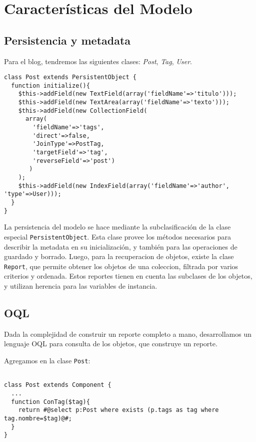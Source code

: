 \section{Características del Modelo}

\subsection{Persistencia y metadata}
\label{sub-pers}

Para el blog, tendremos las siguientes clases: \emph{Post}, \emph{Tag}, \emph{User}.

\begin{verbatim}
class Post extends PersistentObject {
  function initialize(){
    $this->addField(new TextField(array('fieldName'=>'titulo')));
    $this->addField(new TextArea(array('fieldName'=>'texto')));
    $this->addField(new CollectionField(
      array(
        'fieldName'=>'tags',
        'direct'=>false,
        'JoinType'=>PostTag,
        'targetField'=>'tag',
        'reverseField'=>'post')
       )
    );
    $this->addField(new IndexField(array('fieldName'=>'author', 'type'=>User)));
  }
}
\end{verbatim}

La persistencia del modelo se hace mediante la subclasificación de la clase especial \verb"PersistentObject".
Esta clase provee los métodos necesarios para describir la metadata en su inicialización, y también para las operaciones de guardado y borrado.
Luego, para la recuperacion de objetos, existe la clase \verb"Report", que permite obtener los objetos de una coleccion, filtrada por varios criterios y ordenada. Estos reportes tienen en cuenta las subclases de los objetos, y utilizan herencia para las variables de instancia.

\subsection{OQL}
\label{sub-oql}
Dada la complejidad de construir un reporte completo a mano, desarrollamos un lenguaje OQL para consulta de los objetos, que construye un reporte.

Agregamos en la clase \verb"Post":

\begin{verbatim}

class Post extends Component {
  ...
  function ConTag($tag){
    return #@select p:Post where exists (p.tags as tag where tag.nombre=$tag)@#;
  }
}

\end{verbatim}

